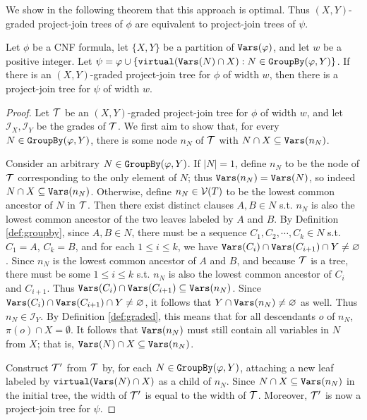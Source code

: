 We show in the following theorem that this approach is optimal. Thus $(X,Y)$-graded project-join trees of $\phi$ are equivalent to project-join trees of $\psi$.
\begin{theorem}
\label{thm:planning_graded_optimal}
Let $\phi$ be a CNF formula, let $\{X, Y\}$ be a partition of $\texttt{\upshape Vars}(\varphi)$, and let $w$ be a positive integer. Let $\psi = \varphi \cup \{\texttt{\upshape virtual}(\texttt{\upshape Vars}(N)\cap X) : N \in \texttt{\upshape GroupBy}(\varphi, Y)\}$. %
If there is an $(X,Y)$-graded project-join tree for $\phi$ of width $w$, then there is a project-join tree for $\psi$ of width $w$.
\end{theorem}
\begin{proof}
Let $\mathcal{T}$ be an $(X,Y)$-graded project-join tree for $\phi$ of width $w$, and let $\mathcal{I}_X, \mathcal{I}_Y$ be the grades of $\mathcal{T}$. 
We first aim to show that, for every $N \in \texttt{\upshape GroupBy}(\varphi, Y)$, there is some node $n_N$ of $\mathcal{T}$ with $N \cap X \subseteq \texttt{\upshape Vars}(n_N)$. 

Consider an arbitrary $N \in \texttt{\upshape GroupBy}(\varphi, Y)$. If $|N| = 1$, define $n_N$ to be the node of $\mathcal{T}$ corresponding to the only element of $N$; thus $\texttt{\upshape Vars}(n_N) = \texttt{\upshape Vars}(N)$, so indeed $N \cap X \subseteq \texttt{\upshape Vars}(n_N)$. 
Otherwise, define $n_N \in \mathcal{V}(T)$ to be the lowest common ancestor of $N$ in $\mathcal{T}$. 
Then there exist distinct clauses $A, B \in N$ s.t. $n_N$ is also the lowest common ancestor of the two leaves labeled by $A$ and $B$. 
By Definition \ref{def:groupby}, since $A, B \in N$, there must be a sequence $C_1, C_2, \cdots, C_k \in N$ s.t. $C_1 = A$, $C_k = B$, and for each $1 \leq i \leq k$, we have $\texttt{\upshape Vars}(C_i) \cap \texttt{\upshape Vars}(C_{i+1}) \cap Y \neq \varnothing$. 
Since $n_N$ is the lowest common ancestor of $A$ and $B$, and because $\mathcal{T}$ is a tree, there must be some $1 \leq i \leq k$ s.t. $n_N$ is also the lowest common ancestor of $C_i$ and $C_{i+1}$. Thus $\texttt{\upshape Vars}(C_i) \cap \texttt{\upshape Vars}(C_{i+1}) \subseteq \texttt{\upshape Vars}(n_N)$. 
Since $\texttt{\upshape Vars}(C_i) \cap \texttt{\upshape Vars}(C_{i+1}) \cap Y \neq \varnothing$, it follows that $Y \cap \texttt{\upshape Vars}(n_N) \neq \varnothing$ as well. Thus $n_N \in \mathcal{I}_Y$. By Definition \ref{def:graded}, this means that for all descendants $o$ of $n_N$, $\pi(o) \cap X = \emptyset$. It follows that $\texttt{\upshape Vars}(n_N)$ must still contain all variables in $N$ from $X$; that is, $\texttt{\upshape Vars}(N) \cap X \subseteq \texttt{\upshape Vars}(n_N)$.

Construct $\mathcal{T}'$ from $\mathcal{T}$ by, for each $N \in \texttt{\upshape GroupBy}(\varphi, Y)$, attaching a new leaf labeled by $\texttt{\upshape virtual}(\texttt{\upshape Vars}(N) \cap X)$ as a child of $n_N$. 
Since $N \cap X \subseteq \texttt{\upshape Vars}(n_N)$ in the initial tree, the width of $\mathcal{T}'$ is equal to the width of $\mathcal{T}$. Moreover, $\mathcal{T}'$ is now a project-join tree for $\psi$.
\end{proof}

